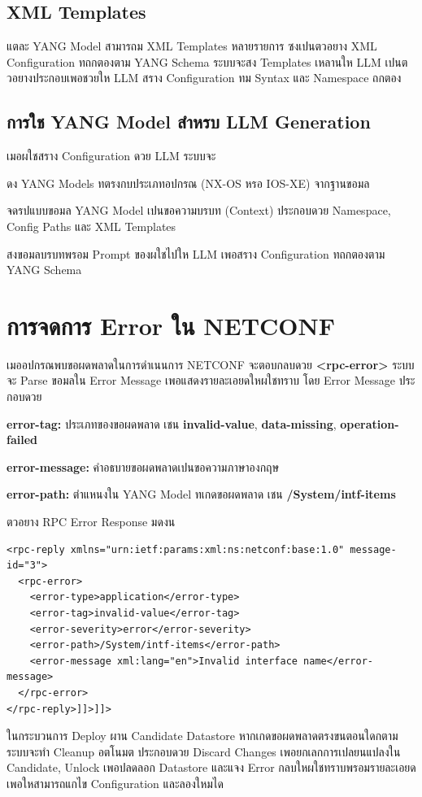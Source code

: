 \subsection{XML Templates}
\hspace*{1.3em}
แตละ YANG Model สามารถม XML Templates หลายรายการ ซงเปนตวอยาง XML Configuration ทถกตองตาม YANG Schema ระบบจะสง Templates เหลานให LLM เปนตวอยางประกอบเพอชวยให LLM สราง Configuration ทม Syntax และ Namespace ถกตอง

\subsection{การใช YANG Model สำหรบ LLM Generation}
\hspace*{1.3em}
เมอผใชสราง Configuration ดวย LLM ระบบจะ

\begin{mycustomenum2}
    \item ดง YANG Models ทตรงกบประเภทอปกรณ (NX-OS หรอ IOS-XE) จากฐานขอมล
    \item จดรปแบบขอมล YANG Model เปนขอความบรบท (Context) ประกอบดวย Namespace, Config Paths และ XML Templates
    \item สงขอมลบรบทพรอม Prompt ของผใชไปให LLM เพอสราง Configuration ทถกตองตาม YANG Schema
\end{mycustomenum2}

\section{การจดการ Error ใน NETCONF}
\hspace*{1.3em}
เมออปกรณพบขอผดพลาดในการดำเนนการ NETCONF จะตอบกลบดวย \textbf{<rpc-error>} ระบบจะ Parse ขอมลใน Error Message เพอแสดงรายละเอยดใหผใชทราบ โดย Error Message ประกอบดวย

\begin{mycustomenum2}
    \item \textbf{error-tag:} ประเภทของขอผดพลาด เชน \textbf{invalid-value}, \textbf{data-missing}, \textbf{operation-failed}
    \item \textbf{error-message:} คำอธบายขอผดพลาดเปนขอความภาษาองกฤษ
    \item \textbf{error-path:} ตำแหนงใน YANG Model ทเกดขอผดพลาด เชน \textbf{/System/intf-items}
\end{mycustomenum2}

\hspace*{1.3em}
ตวอยาง RPC Error Response มดงน

{\fontsize{13}{14}\selectfont
\begin{verbatim}
<rpc-reply xmlns="urn:ietf:params:xml:ns:netconf:base:1.0" message-id="3">
  <rpc-error>
    <error-type>application</error-type>
    <error-tag>invalid-value</error-tag>
    <error-severity>error</error-severity>
    <error-path>/System/intf-items</error-path>
    <error-message xml:lang="en">Invalid interface name</error-message>
  </rpc-error>
</rpc-reply>]]>]]>
\end{verbatim}
}

\hspace*{1.3em}
ในกระบวนการ Deploy ผาน Candidate Datastore หากเกดขอผดพลาดตรงขนตอนใดกตาม ระบบจะทำ Cleanup อตโนมต ประกอบดวย Discard Changes เพอยกเลกการเปลยนแปลงใน Candidate, Unlock เพอปลดลอก Datastore และแจง Error กลบใหผใชทราบพรอมรายละเอยด เพอใหสามารถแกไข Configuration และลองใหมได
